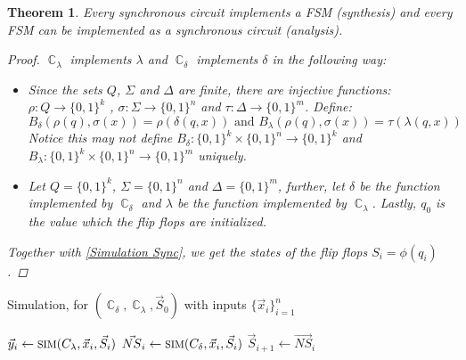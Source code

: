 \documentclass[12pt]{article}
\newcommand{\scrf}[1]{{\scriptstyle\textup{\footnotesize #1}}}
\DeclareMathOperator{\Circ}{\mathbb{C}}
\newcommand*{\B}{\{0,1\}}
\newtheorem{theorem}{Theorem}[subsection]
\begin{document}
\begin{theorem}
  Every synchronous circuit implements a FSM (synthesis) and every FSM can be implemented as a synchronous circuit (analysis).
  \begin{proof}
    $\Circ_\lambda$ implements $\lambda$ and $\Circ_\delta$ implements $\delta$ in the following way: 
    \begin{itemize}
      \item[(Synthesis)] Since the sets $Q$, $\Sigma$ and $\Delta$ are finite, there are injective functions: $\rho:Q\to\B^k$ , $\sigma:\Sigma\to\B^n$ and $\tau:\Delta\to\B^m$. Define: $$B_\delta(\rho(q),\sigma(x))=\rho(\delta(q,x))\text{ and }B_\lambda(\rho(q),\sigma(x))=\tau(\lambda(q,x))$$ Notice this may not define $B_\delta:\B^k\times\B^n\to\B^k$ and $B_\lambda:\B^k\times\B^n\to\B^m$ uniquely.
      \item[(Analysis)] Let $Q=\B^k$, $\Sigma=\B^n$ and $\Delta=\B^m$, further, let $\delta$ be the function implemented by $\Circ_\delta$ and $\lambda$ be the function implemented by $\Circ_\lambda$. Lastly, $q_0$ is the value which the flip flops are initialized.
    \end{itemize}
    Together with \ref{Simulation Sync}, we get the states of the flip flops $S_i=\phi(q_i)$.
  \end{proof}
\end{theorem}

\begin{algorithm}[H]
  \caption{Simulation, for $(\Circ_\delta,\Circ_\lambda,\vec{S}_0)$ with inputs $\{\vec{x}_i\}_{i=1}^n$}
  \begin{algorithmic}
      \State $\vec{y}_i\gets \scrf{SIM}(C_\lambda,\vec{x}_i,\vec{S}_i)$
      \State $\vec{NS}_i\gets \scrf{SIM}(C_\delta,\vec{x}_i,\vec{S}_i)$
      \State $\vec{S}_{i+1}\gets \vec{NS}_i$
    \EndFor
  \end{algorithmic}
  \label{Simulation Sync}
\end{algorithm}
\end{document}
